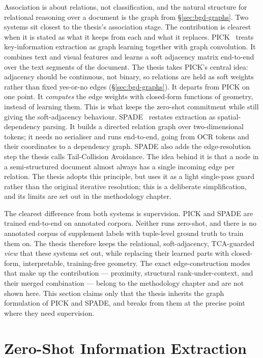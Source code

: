 Association is about relations, not classification, and the natural structure for relational reasoning over a document is the graph from \S\ref{sec:bgd-graphs}. Two systems sit closest to the thesis's association stage. The contribution is clearest when it is stated as what it keeps from each and what it replaces. PICK~\cite{yu2020pick} treats key-information extraction as graph learning together with graph convolution. It combines text and visual features and learns a soft adjacency matrix end-to-end over the text segments of the document. The thesis takes PICK's central idea: adjacency should be continuous, not binary, so relations are held as soft weights rather than fixed yes-or-no edges (\S\ref{sec:bgd-graphs}). It departs from PICK on one point. It \emph{computes} the edge weights with closed-form functions of geometry, instead of learning them. This is what keeps the zero-shot commitment while still giving the soft-adjacency behaviour. SPADE~\cite{hwang2021spade} restates extraction as spatial-dependency parsing. It builds a directed relation graph over two-dimensional tokens; it needs no serialiser and runs end-to-end, going from OCR tokens and their coordinates to a dependency graph. SPADE also adds the edge-resolution step the thesis calls Tail-Collision Avoidance. The idea behind it is that a node in a semi-structured document almost always has a single incoming edge per relation. The thesis adopts this principle, but uses it as a light single-pass guard rather than the original iterative resolution; this is a deliberate simplification, and its limits are set out in the methodology chapter.

The clearest difference from both systems is supervision. PICK and SPADE are trained end-to-end on annotated corpora. Neither runs zero-shot, and there is no annotated corpus of supplement labels with tuple-level ground truth to train them on. The thesis therefore keeps the relational, soft-adjacency, TCA-guarded \emph{view} that these systems set out, while replacing their learned parts with closed-form, interpretable, training-free geometry. The exact edge-construction modes that make up the contribution --- proximity, structural rank-under-context, and their merged combination --- belong to the methodology chapter and are not shown here. This section claims only that the thesis inherits the graph formulation of PICK and SPADE, and breaks from them at the precise point where they need supervision.

\section{Zero-Shot Information Extraction}\label{sec:rw-zeroshot}

